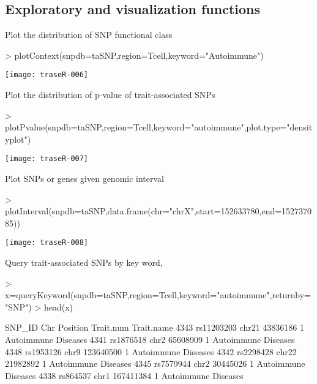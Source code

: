 \documentclass{article}
\begin{document}
\subsection{Exploratory and visualization functions}
Plot the distribution of SNP functional class
\begin{Schunk}
\begin{Sinput}
> plotContext(snpdb=taSNP,region=Tcell,keyword="Autoimmune")
\end{Sinput}
\end{Schunk}
\texttt{[image: traseR-006]}

Plot the distribution of p-value of trait-associated SNPs
\begin{Schunk}
\begin{Sinput}
> plotPvalue(snpdb=taSNP,region=Tcell,keyword="autoimmune",plot.type="densityplot")
\end{Sinput}
\end{Schunk}
\texttt{[image: traseR-007]}

Plot SNPs or genes given genomic interval
\begin{Schunk}
\begin{Sinput}
> plotInterval(snpdb=taSNP,data.frame(chr="chrX",start=152633780,end=152737085))
\end{Sinput}
\end{Schunk}
\texttt{[image: traseR-008]}

Query trait-associated SNPs by key word,
\begin{Schunk}
\begin{Sinput}
> x=queryKeyword(snpdb=taSNP,region=Tcell,keyword="autoimmune",returnby="SNP")
> head(x)
\end{Sinput}
\begin{Soutput}
         SNP_ID   Chr  Position Trait.num          Trait.name
4343 rs11203203 chr21  43836186         1 Autoimmune Diseases
4341  rs1876518  chr2  65608909         1 Autoimmune Diseases
4348  rs1953126  chr9 123640500         1 Autoimmune Diseases
4342  rs2298428 chr22  21982892         1 Autoimmune Diseases
4345  rs7579944  chr2  30445026         1 Autoimmune Diseases
4338   rs864537  chr1 167411384         1 Autoimmune Diseases
\end{Soutput}
\end{Schunk}
\end{document}
